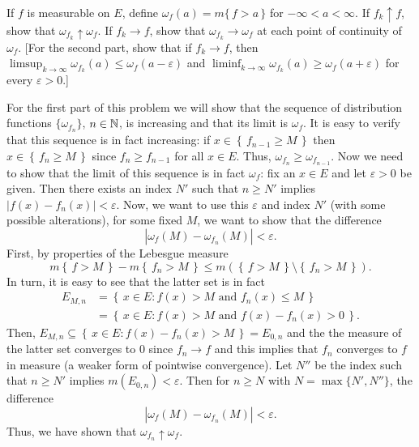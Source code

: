 \begin{problem}
  If $f$ is measurable on $E$, define
  $\omega_f(a)=m\{\,f>a\,\}$ for $-\infty<a<\infty$. If
  $f_k\uparrow f$, show that $\omega_{f_k}\uparrow\omega_f$. If $f_k\to f$,
  show that $\omega_{f_k}\to\omega_f$ at each point of continuity of
  $\omega_f$. [For the second part, show that if $f_k\to f$, then
  $\limsup_{k\to\infty}\omega_{f_k}(a)\leq\omega_f(a-\varepsilon)$ and
  $\liminf_{k\to\infty}\omega_{f_k}(a)\geq\omega_f(a+\varepsilon)$ for
  every $\varepsilon>0$.]
\end{problem}
\begin{solution}
  For the first part of this problem we will show that the sequence of
  distribution functions $\{\omega_{f_n}\}$, $n\in\mathbb{N}$, is increasing and
  that its limit is $\omega_f$. It is easy to verify that this sequence is
  in fact increasing: if $x\in\left\{\,f_{n-1}\geq M\,\right\}$ then
  $x\in\left\{\,f_n\geq M\,\right\}$ since $f_n\geq f_{n-1}$ for all
  $x\in E$. Thus, $\omega_{f_n}\geq\omega_{f_{n-1}}$. Now we need to show
  that the limit of this sequence is in fact $\omega_f$: fix an $x\in E$
  and let $\varepsilon>0$ be given. Then there exists an index $N'$ such
  that $n\geq N'$ implies $|f(x)-f_n(x)|<\varepsilon$. Now, we want to use
  this $\varepsilon$ and index $N'$ (with some possible alterations), for
  some fixed $M$, we want to show that the difference
  \[
    \left| \omega_f(M)-\omega_{f_n}(M) \right|<\varepsilon.
  \]
  First, by properties of the Lebesgue measure
  \[
    m\left\{\,f>M\,\right\}-m\left\{\,f_n>M\,\right\}\leq
    m\left(\left\{\,f>M\,\right\}\setminus \left\{\,f_n>M\,\right\}\right).
  \]
  In turn, it is easy to see that the latter set is in fact
  \begin{align*}
    E_{M,n}
    &=\left\{\,x\in E:\text{$f(x)>M$ and $f_n(x)\leq M$}\,\right\}\\
    &=\left\{\,x\in E:\text{$f(x)>M$ and $f(x)-f_n(x)>0$}\,\right\}.
  \end{align*}
  Then, $E_{M,n}\subseteq\left\{\,x\in E:f(x)-f_n(x)>M\,\right\}=E_{0,n}$
  and the the measure of the latter set converges to $0$ since $f_n\to f$
  and this implies that $f_n$ converges to $f$ in measure (a weaker form of
  pointwise convergence). Let $N''$ be the index such that $n\geq N'$
  implies $m(E_{0,n})<\varepsilon$. Then for $n\geq N$ with
  $N=\max\{N',N''\}$, the difference
  \[
    \left| \omega_f(M)-\omega_{f_n}(M) \right|<\varepsilon.
  \]
  Thus, we have shown that $\omega_{f_n}\uparrow\omega_f$.
\end{solution}

